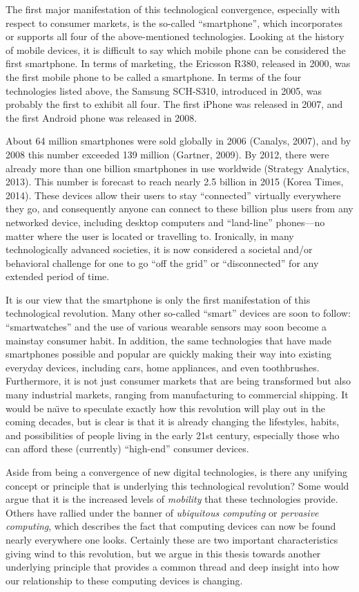 The first major manifestation of this technological convergence, especially with respect to consumer markets, is the so-called ``smartphone'', which incorporates or supports all four of the above-mentioned technologies. Looking at the history of mobile devices, it is difficult to say which mobile phone can be considered the first smartphone. In terms of marketing, the Ericsson R380, released in 2000, was the first mobile phone to be called a smartphone. In terms of the four technologies listed above, the Samsung SCH-S310, introduced in 2005, was probably the first to exhibit all four. The first iPhone was released in 2007, and the first Android phone was released in 2008.

About 64 million smartphones were sold globally in 2006 (Canalys, 2007), and by 2008 this number exceeded 139 million (Gartner, 2009). By 2012, there were already more than one billion smartphones in use worldwide (Strategy Analytics, 2013). This number is forecast to reach nearly 2.5 billion in 2015 (Korea Times, 2014). These devices allow their users to stay ``connected'' virtually everywhere they go, and consequently anyone can connect to these billion plus users from any networked device, including desktop computers and ``land-line'' phones---no matter where the user is located or travelling to. Ironically, in many technologically advanced societies, it is now considered a societal and/or behavioral challenge for one to go ``off the grid'' or ``disconnected'' for any extended period of time.

It is our view that the smartphone is only the first manifestation of this technological revolution. Many other so-called ``smart'' devices are soon to follow: ``smartwatches'' and the use  of various wearable sensors may soon become a mainstay consumer habit. In addition, the same technologies that have made smartphones possible and popular are quickly making their way into existing everyday devices, including cars, home appliances, and even toothbrushes. Furthermore, it is not just consumer markets that are being transformed but also many industrial markets, ranging from manufacturing to commercial shipping. It would be  na\"{\i}ve to speculate exactly how this revolution will play out in the coming decades, but is clear is that it is already changing the lifestyles, habits, and possibilities of people living in the early 21st century, especially those who can afford these (currently) ``high-end'' consumer devices.

Aside from being a convergence of new digital technologies, is there any unifying concept or principle that is underlying this technological revolution? Some would argue that it is the increased levels of \emph{mobility} that these technologies provide. Others have rallied under the banner of \emph{ubiquitous computing} or \emph{pervasive computing}, which describes the fact that computing devices can now be found nearly everywhere one looks. Certainly these are two important characteristics giving wind to this revolution, but we argue in this thesis towards another underlying principle that provides a common thread and deep insight into how our relationship to these computing devices is changing.

